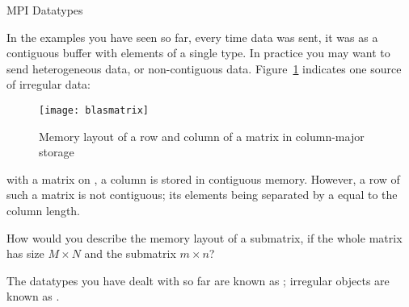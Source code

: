 
 {MPI Datatypes}


In the examples you have seen so far, every time data was sent,
it was as a contiguous buffer with elements of a single type.
In practice you may want to send heterogeneous data, or
non-contiguous data.
Figure~\ref{fig:blasmatrix} indicates one source of irregular
data:
%
\begin{figure}[ht]
  \texttt{[image: blasmatrix]}
  \caption{Memory layout of a row and column of a matrix in column-major storage}
  \label{fig:blasmatrix}
\end{figure}
%
with a matrix on , a column is
stored in contiguous memory. However, a row of such a matrix
is not contiguous; its elements being separated by a 
equal to the column length.

\begin{exercise}
  \label{ex:submatrix}
  How would you describe the memory layout of a submatrix,
  if the whole matrix has size $M\times N$ and the submatrix $m\times n$?
\end{exercise}

The datatypes you have dealt with so far are known as
; irregular objects
are known as .








